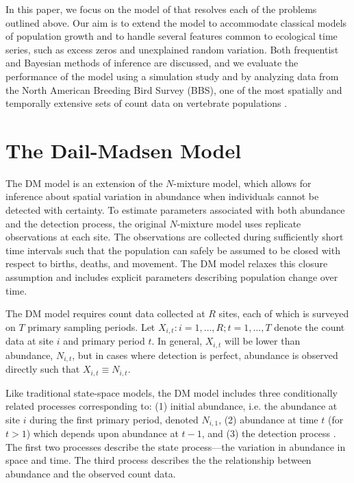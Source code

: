 \documentclass[12pt,english]{article}
\begin{document}
\begin{spacing}{1.9}
\begin{flushleft}
In this paper, we focus on the model of \citet[henceforth the DM model]{dail_madsen:2011}
that resolves each of the problems outlined above. 
Our aim is to extend the
model to accommodate classical models of population growth and
to handle several features common to ecological
time series, such as excess zeros and unexplained random variation. 
Both frequentist and Bayesian methods of inference are discussed, and
we evaluate the performance of the model using a simulation study and by
analyzing data from the North American Breeding Bird Survey (BBS), one of
the most spatially and temporally extensive sets of count data on
vertebrate populations \citep{robbins_etal:1986}.

\section*{The Dail-Madsen Model}
\label{sec:dm}

The DM model is an extension of the 
\citet{royle:2004biom} $N$-mixture model, which allows for inference about spatial
variation in abundance when individuals cannot be detected with
certainty. To estimate parameters associated with both abundance 
and the detection process, the original $N$-mixture model uses replicate
observations at each site. The observations are collected during sufficiently
short time intervals such that the population can safely be
assumed to be closed with respect to births, deaths, and movement. The DM
model relaxes this closure assumption and includes explicit parameters
describing population change over time.

The DM model requires count data collected at $R$ sites, each of
which is surveyed on $T$ primary sampling periods. 
Let $X_{i,t}: i=1,\hdots,R; t=1,\hdots,T$ denote the count data
at site $i$ and primary period $t$. 
In general, $X_{i,t}$ will be lower than abundance, 
$N_{i,t}$, but in cases where detection is perfect,
abundance is observed directly such that $X_{i,t} \equiv N_{i,t}$.

Like traditional state-space models, the DM model includes 
three conditionally related processes corresponding to: 
(1) initial abundance, i.e. the
abundance at site $i$ during the first primary period,
denoted $N_{i,1}$, (2) abundance at time $t$ (for $t>1$) which depends upon
abundance at $t-1$, and (3) the
detection process \citep{dail_madsen:2011}.
The first two processes describe the state process---the
variation in abundance in space and time. The third process 
describes the the relationship between
abundance and the observed count data.


\end{flushleft}
\end{spacing}
\end{document}
